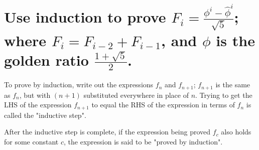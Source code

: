 \section[Problem 2]{Use induction to prove $F_i = \frac{\phi^i - \hat{\phi}^i}{\sqrt{5}}$; where $F_i = F_{i-2} + F_{i-1}$, and $\phi$ is the golden ratio $\frac{1 + \sqrt{5}}{2}$.}

To prove by induction, write out the expressions $f_n$ and $f_{n + 1}$; $f_{n + 1}$ is the same as $f_n$, but with $(n + 1)$ substituted everywhere in place of $n$. Trying to get the LHS of the expression $f_{n + 1}$ to equal the RHS of the expression in terms of $f_n$ is called the "inductive step". 

After the inductive step is complete, if the expression being proved $f_c$ also holds for some constant $c$, the expression is said to be "proved by induction".


